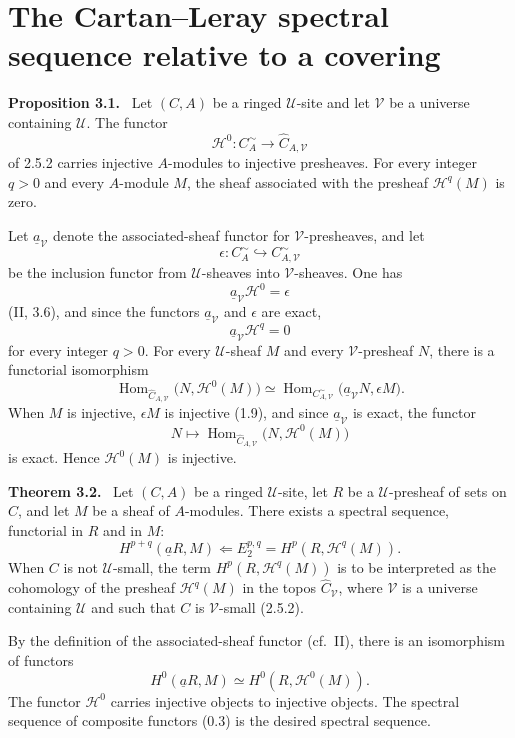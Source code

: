 \documentclass[11pt]{article}
\newcommand{\U}{\mathcal{U}}
\newcommand{\V}{\mathcal{V}}
\newcommand{\Hh}{\mathcal{H}}
\newcommand{\Hom}{\operatorname{Hom}}
\newcommand{\cf}{cf.}
\newenvironment{statement}[1]{\par\medskip\noindent\textbf{#1.}\ }{\par\medskip}
\begin{document}
\section{The Cartan--Leray spectral sequence relative to a covering}

\begin{statement}{Proposition 3.1}
Let $(C,A)$ be a ringed $\U$-site and let $\V$ be a universe containing $\U$. The functor
\[
\Hh^0:C^\sim_A\longrightarrow \widehat C_{A,\V}
\]
of 2.5.2 carries injective $A$-modules to injective presheaves. For every integer $q>0$ and every $A$-module $M$, the sheaf associated with the presheaf $\Hh^q(M)$ is zero.
\end{statement}

Let $\underline a_{\V}$ denote the associated-sheaf functor for $\V$-presheaves, and let
\[
\epsilon:C^\sim_A\hookrightarrow C^\sim_{A,\V}
\]
be the inclusion functor from $\U$-sheaves into $\V$-sheaves. One has
\[
\underline a_{\V}\Hh^0=\epsilon
\]
(II, 3.6), and since the functors $\underline a_{\V}$ and $\epsilon$ are exact,
\[
\underline a_{\V}\Hh^q=0
\]
for every integer $q>0$. For every $\U$-sheaf $M$ and every $\V$-presheaf $N$, there is a functorial isomorphism
\[
\Hom_{\widehat C_{A,\V}}\bigl(N,\Hh^0(M)\bigr)
\simeq
\Hom_{C^\sim_{A,\V}}\bigl(\underline a_{\V}N,\epsilon M\bigr).
\]
When $M$ is injective, $\epsilon M$ is injective (1.9), and since $\underline a_{\V}$ is exact, the functor
\[
N\longmapsto \Hom_{\widehat C_{A,\V}}\bigl(N,\Hh^0(M)\bigr)
\]
is exact. Hence $\Hh^0(M)$ is injective.

\begin{statement}{Theorem 3.2}
Let $(C,A)$ be a ringed $\U$-site, let $R$ be a $\U$-presheaf of sets on $C$, and let $M$ be a sheaf of $A$-modules. There exists a spectral sequence, functorial in $R$ and in $M$:
\[
H^{p+q}(\underline a R,M)\Longleftarrow
E_2^{p,q}=H^p(R,\Hh^q(M)).
\tag{3.2.1}
\]
When $C$ is not $\U$-small, the term $H^p(R,\Hh^q(M))$ is to be interpreted as the cohomology of the presheaf $\Hh^q(M)$ in the topos $\widehat C_{\V}$, where $\V$ is a universe containing $\U$ and such that $C$ is $\V$-small (2.5.2).
\end{statement}

By the definition of the associated-sheaf functor (\cf\ II), there is an isomorphism of functors
\[
H^0(\underline a R,M)\simeq H^0(R,\Hh^0(M)).
\]
The functor $\Hh^0$ carries injective objects to injective objects. The spectral sequence of composite functors (0.3) is the desired spectral sequence.
\end{document}
